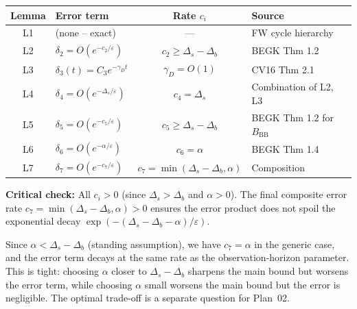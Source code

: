 \documentclass[11pt]{article}
\newcommand{\eps}{\varepsilon}
\newcommand{\Ds}{\Delta_s}
\newcommand{\Db}{\Delta_b}
\newcommand{\BBB}{B_{\mathrm{BB}}}
\begin{document}
\begin{center}
\renewcommand{\arraystretch}{1.3}
\begin{tabular}{|c|l|c|l|}
\hline
\textbf{Lemma} & \textbf{Error term} & \textbf{Rate $c_i$}
  & \textbf{Source} \\
\hline\hline
L1 & (none -- exact) & --- & FW cycle hierarchy \\
\hline
L2 & $\delta_2 = O(e^{-c_2/\eps})$
  & $c_2 \geq \Ds - \Db$
  & BEGK Thm 1.2 \\
\hline
L3 & $\delta_3(t) = C_3 e^{-\gamma_D t}$
  & $\gamma_D = O(1)$
  & CV16 Thm 2.1 \\
\hline
L4 & $\delta_4 = O(e^{-\Ds/\eps})$
  & $c_4 = \Ds$
  & Combination of L2, L3 \\
\hline
L5 & $\delta_5 = O(e^{-c_5/\eps})$
  & $c_5 \geq \Ds - \Db$
  & BEGK Thm 1.2 for $\BBB$ \\
\hline
L6 & $\delta_6 = O(e^{-\alpha/\eps})$
  & $c_6 = \alpha$
  & BEGK Thm 1.4 \\
\hline
L7 & $\delta_7 = O(e^{-c_7/\eps})$
  & $c_7 = \min(\Ds - \Db, \alpha)$
  & Composition \\
\hline
\end{tabular}
\end{center}

\medskip
\noindent
\textbf{Critical check:} All $c_i > 0$ (since $\Ds > \Db$ and
$\alpha > 0$). The final composite error rate
$c_7 = \min(\Ds - \Db, \alpha) > 0$ ensures the error product
does not spoil the exponential decay $\exp(-(\Ds - \Db - \alpha)/\eps)$.

Since $\alpha < \Ds - \Db$ (standing assumption), we have
$c_7 = \alpha$ in the generic case, and the error term decays
at the same rate as the observation-horizon parameter. This is
tight: choosing $\alpha$ closer to $\Ds - \Db$ sharpens the
main bound but worsens the error term, while choosing $\alpha$
small worsens the main bound but the error is negligible. The
optimal trade-off is a separate question for Plan~02.

\end{document}
